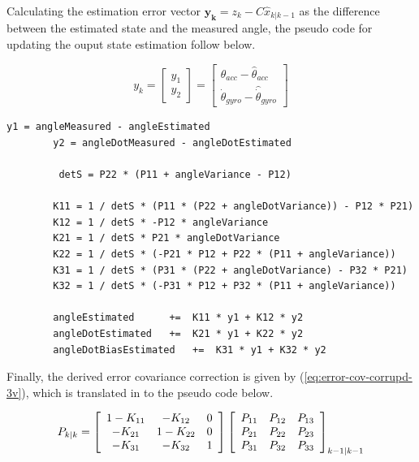 \documentclass[a4paper]{report}
\begin{document}
Calculating the estimation error vector $\mathbf{y_k}=z_k - C\hat{x}_{k|k-1}$ as the difference between the estimated state and the measured angle, the pseudo code for updating the ouput state estimation follow below.

\begin{equation}
		\label{eq:state-meas-difference-3v}
		y_k =
		\left[ \begin{array}{c}
		y_1 \\
		y_2
		\end{array} \right]
		=
		\left[ \begin{array}{c}
		\theta_{acc} - \hat{\theta}_{acc} \\
		\dot{\theta}_{gyro} - \hat{\dot{\theta}}_{gyro}
		\end{array} \right]
\end{equation}

		\begin{lstlisting}[frame=single, caption={Correct state estimate pseudo code}, label={pseudo:correct-state-estimate-3v}]
		y1 = angleMeasured - angleEstimated
		y2 = angleDotMeasured - angleDotEstimated

		 detS = P22 * (P11 + angleVariance - P12)

		K11 = 1 / detS * (P11 * (P22 + angleDotVariance)) - P12 * P21)
		K12 = 1 / detS * -P12 * angleVariance
		K21 = 1 / detS * P21 * angleDotVariance
		K22 = 1 / detS * (-P21 * P12 + P22 * (P11 + angleVariance))
		K31 = 1 / detS * (P31 * (P22 + angleDotVariance) - P32 * P21)
		K32 = 1 / detS * (-P31 * P12 + P32 * (P11 + angleVariance))

		angleEstimated		+=  K11 * y1 + K12 * y2
		angleDotEstimated	+=  K21 * y1 + K22 * y2
		angleDotBiasEstimated	+=  K31 * y1 + K32 * y2
		\end{lstlisting}

		
Finally, the derived error covariance correction is given by (\ref{eq:error-cov-corrupd-3v}), which is translated in to the pseudo code below. 

\begin{equation}
\label{eq:error-cov-corrupd-3v}
		P_{k|k} =
      		\left[ \begin{array}{c c c}
	          1 - K_{11} & - K_{12} & 0 \\
	          -K_{21} & 1 - K_{22} & 0 \\
	          -K_{31} & -K_{32} & 1
		\end{array} \right]
		\left[ \begin{array}{c c c}
		P_{11} & P_{12} & P_{13} \\
		P_{21} & P_{22} & P_{23} \\
		P_{31} & P_{32} & P_{33}
		\end{array}\right]_{k-1|k-1}
\end{equation}
\end{document}
